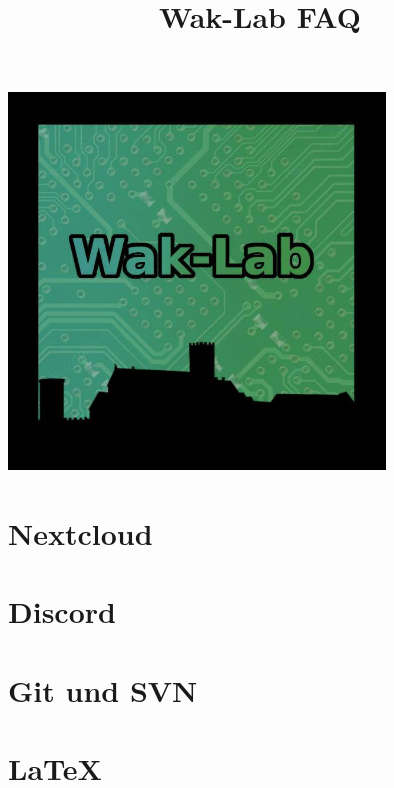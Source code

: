 

\title{Wak-Lab FAQ}


\maketitle

\maketitle
\begin{center}
\includegraphics[height=10cm]{pictures/LOGO.jpg}
\end{center}
\newpage

\section{Nextcloud}

\section{Discord}

\section{Git und SVN}

\section{\LaTeX}




